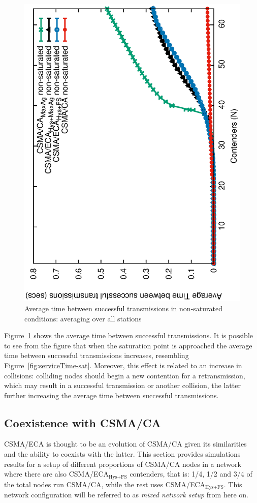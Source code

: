 	\begin{figure}[tb]
		\centering
		\includegraphics[width=0.7\linewidth,angle=-90]{figures/unsaturated/timeBetweenSxTx-unsat/timeBetweenSxTx-multiplot-unsat-TON.eps}
		\caption{Average time between successful transmissions in non-saturated conditions: averaging over all stations}
		\label{fig:timeBetweenSxTx-multiplot-unsat}
	\end{figure}	
	
	Figure~\ref{fig:timeBetweenSxTx-multiplot-unsat} shows the average time between successful transmissions. It is possible to see from the figure that when the saturation point is approached the average time between successful transmissions increases, resembling Figure~\ref{fig:serviceTime-sat}. Moreover, this effect is related to an increase in collisions: colliding nodes should begin a new contention for a retransmission, which may result in a successful transmission or another collision, the latter further increasing the average time between successful transmissions.
	
	\subsection{Coexistence with CSMA/CA}\label{coexistance-w-csmaca}
	
	CSMA/ECA is thought to be an evolution of CSMA/CA given its similarities and the ability to coexists with the latter. This section provides simulations results for a setup of different proportions of CSMA/CA nodes in a network where there are also CSMA/ECA$_{\text{Hys+FS}}$ contenders, that is: 1/4, 1/2 and 3/4 of the total nodes run CSMA/CA, while the rest uses CSMA/ECA$_{\text{Hys+FS}}$. This network configuration will be referred to as \emph{mixed network setup} from here on.	
